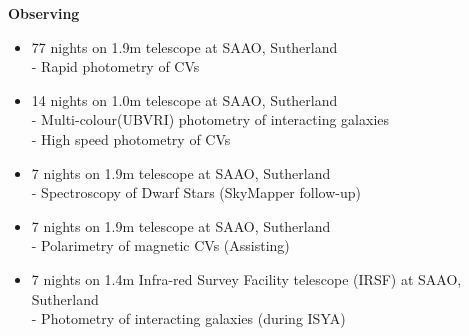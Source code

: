 \documentclass{article}
\begin{document}
\vspace{0.2cm}
\large\textbf{Observing}
\normalsize
\vspace{0.2cm}
\begin{itemize}
 \item 77 nights on 1.9m telescope at SAAO, Sutherland \\
 \hspace*{0.4cm} - Rapid photometry of CVs
 
 \item 14 nights on 1.0m telescope at SAAO, Sutherland \\
 \hspace*{0.4cm} -  Multi-colour(UBVRI) photometry of interacting galaxies \\
 \hspace*{0.4cm} -  High speed photometry of CVs
 
 \item 7 nights on 1.9m telescope at SAAO, Sutherland \\
 \hspace*{0.4cm} - Spectroscopy of Dwarf Stars (SkyMapper follow-up)
 
 \item 7 nights on 1.9m telescope at SAAO, Sutherland \\
 \hspace*{0.4cm} - Polarimetry of magnetic CVs (Assisting)
 
 \item 7 nights on 1.4m Infra-red Survey Facility telescope (IRSF) at SAAO, Sutherland \\
 \hspace*{0.4cm} - Photometry of interacting galaxies (during ISYA)
 
\end{itemize}

  
  
\end{document}
